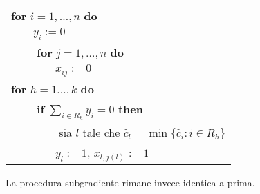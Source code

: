 \documentclass[11pt]{book}
\begin{document}
\vspace{15pt}
  \begin{tabular}{l}
    \textbf{for} $i=1,\dots,n$ \textbf{do}\\
    $\qquad y_i := 0$\\
    $\qquad$ \textbf{for} $j=1,\dots,n$ \textbf{do}\\
    $\qquad\qquad x_{ij} := 0$\\
\textbf{for} $h=1\dots,k$ \textbf{do}\\
$\qquad$ \textbf{if} $\sum\limits_{i \in R_h}y_i =0$ \textbf{then}\\
$\qquad\qquad$ sia $l$ tale che $\hat{c}_l = \min\{ \hat{c}_i  : i\in
R_h\}$\\
$\qquad\qquad y_l :=1$, $x_{l,j(l)}:=1$
\end{tabular}
\vspace{15pt}

La procedura subgradiente rimane invece identica a prima.
\end{document}
